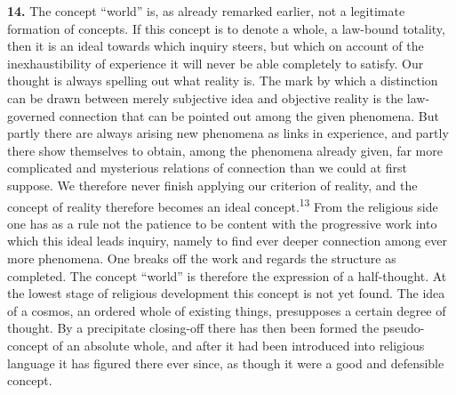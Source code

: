 \documentclass[12pt,a4paper]{book}
\newcommand{\opage}[1]{\marginnote{\footnotesize\textit{[#1]}}}
\begin{document}
\medskip

\noindent\textbf{14.} The concept ``world'' is, as already remarked earlier,
not a legitimate formation of concepts.
If this concept is to denote a whole, a law-bound totality, then it is an
ideal towards which inquiry steers, but which on account of the
inexhaustibility of experience it will never be able completely to satisfy.
Our thought is always spelling out what reality is. The mark by which a
distinction can be drawn between merely subjective idea and objective reality
is the law-governed connection that can be pointed out among the given
phenomena. But partly there are always arising new phenomena as links in
experience, and partly there show themselves to obtain, among the phenomena
already given, far more complicated and mysterious relations of connection
than we could at first suppose. We therefore never finish applying our
criterion of reality, and the concept of reality therefore becomes an ideal
concept.\textsuperscript{13} From the religious side one has as a rule not the
patience to be content with the progressive work into which this ideal leads
inquiry, namely to find ever deeper connection among ever more phenomena. One
breaks off the work and regards the structure as completed. The concept
``world'' is therefore the expression of a half-thought. At the lowest stage
of religious development this concept is not yet found. The idea of a cosmos,
an ordered whole of 
\opage{37}existing things, presupposes a certain degree of thought.
By a precipitate closing-off there has then been formed the pseudo-concept of
an absolute whole, and after it had been introduced into religious language it
has figured there ever since, as though it were a good and defensible concept.
\end{document}
